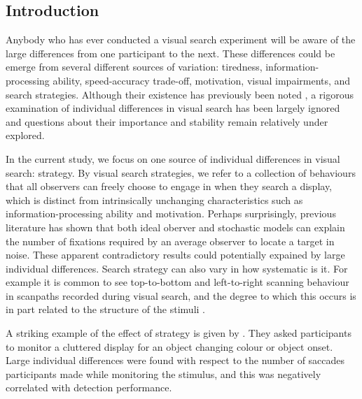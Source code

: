 \documentclass[]{rsos}%
\begin{document}
\begin{fmtext}
\section{Introduction}

Anybody who has ever conducted a visual search experiment will be aware of the large differences from one participant to the next. These differences could be emerge from several different sources of variation: tiredness\cite{mackworth1948}, information-processing ability, speed-accuracy trade-off, motivation, visual impairments, and search strategies\cite{boot2006}. Although their existence has previously been noted \cite{mackworth1948}, a rigorous examination of individual differences in visual search has been largely ignored and questions about their importance and stability remain relatively under explored. 

In the current study, we focus on one source of individual differences in visual search: strategy. By visual search strategies, we refer to a collection of behaviours that all observers can freely choose to engage in when they search a display, which is distinct from intrinsically unchanging characteristics such as information-processing ability and motivation. Perhaps surprisingly, previous literature has shown that both ideal oberver \cite{najemnik-geisler2008} and stochastic \cite{clarke2016} models can explain the number of fixations required by an average observer to locate a target in noise. These apparent contradictory results could potentially expained by large individual differences. Search strategy can also vary in how systematic is it. For example it is common to see top-to-bottom and left-to-right scanning behaviour in scanpaths recorded during visual search\cite{gilchrist2006}, and the degree to which this occurs is in part related to the structure of the stimuli \cite{amor2017}.

\end{fmtext}
\maketitle

A striking example of the effect of strategy is given by \cite{boot2006}. They asked participants to monitor a cluttered display for an object changing colour or object onset. Large individual differences were found with respect to the number of saccades participants made while monitoring the stimulus, and this was negatively correlated with detection performance. 
\end{document}
